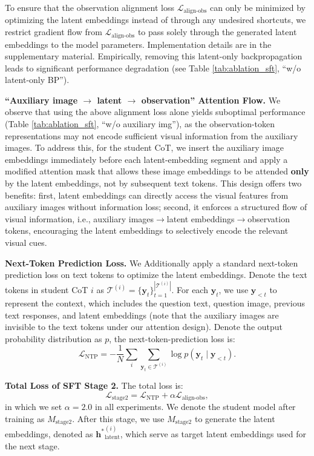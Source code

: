 To ensure that the observation alignment loss $\mathcal{L}_{\text{align-obs}}$ can only be minimized by optimizing the latent embeddings instead of through any undesired shortcuts, we restrict gradient flow from $\mathcal{L}_{\text{align-obs}}$ to pass solely through the generated latent embeddings to the model parameters. Implementation details are in the supplementary material. Empirically, removing this latent-only backpropagation leads to significant performance degradation (see Table \ref{tab:ablation_sft}, ``w/o latent-only BP'').

\textbf{``Auxiliary image $\rightarrow$ latent $\rightarrow$ observation'' Attention Flow.}
We observe that using the above alignment loss alone yields suboptimal performance (Table \ref{tab:ablation_sft}, “w/o auxiliary img”), as the observation-token representations may not encode sufficient visual information from the auxiliary images. To address this, for the student CoT, we insert the auxiliary image embeddings immediately before each latent-embedding segment and apply a modified attention mask that allows these image embeddings to be attended \textbf{only} by the latent embeddings, not by subsequent text tokens. This design offers two benefits:
first, latent embeddings can directly access the visual features from auxiliary images without information loss;
second, it enforces a structured flow of visual information, i.e., auxiliary images$\rightarrow$latent embeddings$\rightarrow$observation tokens, encouraging the latent embeddings to selectively encode the relevant visual cues.

\textbf{Next-Token Prediction Loss.} We Additionally apply a standard next-token prediction loss on text tokens to optimize the latent embeddings. Denote the text tokens in student CoT $i$ as $\mathcal{T}^{(i)}=\{\mathbf{y}_t\}_{t=1}^{|\mathcal{T}^{(i)}|}$. For each $\mathbf{y}_t$, we use $\mathbf{y}_{<t}$ to represent the context, which includes the question text, question image, previous text responses, and latent embeddings (note that the auxiliary images are invisible to the text tokens under our attention design). Denote the output probability distribution as $p$, the next-token-prediction loss is:
\begin{equation}
\label{loss:ntp}
    \mathcal{L}_{\text{NTP}} = -\frac{1}{N} \sum_i \sum_{\mathbf{y}_t\in \mathcal{T}^{(i)}} \log p (\mathbf{y}_t \mid \mathbf{y}_{<t} ).
\end{equation}

\textbf{Total Loss of SFT Stage 2.} The total loss is:
\begin{equation}
    \mathcal{L}_{\text{stage2}} = \mathcal{L}_{\text{NTP}} + \alpha \mathcal{L}_{\text{align-obs}},
\end{equation}
in which we set $\alpha=2.0$ in all experiments. We denote the student model after training as $M_{\text{stage2}}$. After this stage, we use $M_{\text{stage2}}$ to generate the latent embeddings, denoted as $\mathbf{h^*}^{(i)}_{\text{latent}}$, which serve as target latent embeddings used for the next stage.



